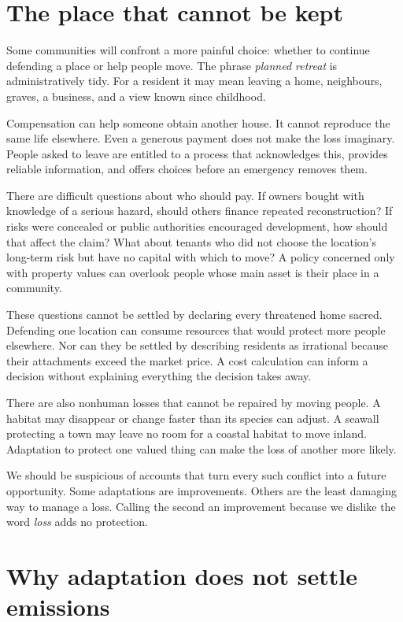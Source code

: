 \documentclass[12pt,a4paper]{book}
\begin{document}
\section*{The place that cannot be kept}

Some communities will confront a more painful choice: whether to continue defending a place or help people move. The phrase \emph{planned retreat} is administratively tidy. For a resident it may mean leaving a home, neighbours, graves, a business, and a view known since childhood.

Compensation can help someone obtain another house. It cannot reproduce the same life elsewhere. Even a generous payment does not make the loss imaginary. People asked to leave are entitled to a process that acknowledges this, provides reliable information, and offers choices before an emergency removes them.

There are difficult questions about who should pay. If owners bought with knowledge of a serious hazard, should others finance repeated reconstruction? If risks were concealed or public authorities encouraged development, how should that affect the claim? What about tenants who did not choose the location's long-term risk but have no capital with which to move? A policy concerned only with property values can overlook people whose main asset is their place in a community.

These questions cannot be settled by declaring every threatened home sacred. Defending one location can consume resources that would protect more people elsewhere. Nor can they be settled by describing residents as irrational because their attachments exceed the market price. A cost calculation can inform a decision without explaining everything the decision takes away.

There are also nonhuman losses that cannot be repaired by moving people. A habitat may disappear or change faster than its species can adjust. A seawall protecting a town may leave no room for a coastal habitat to move inland. Adaptation to protect one valued thing can make the loss of another more likely.

We should be suspicious of accounts that turn every such conflict into a future opportunity. Some adaptations are improvements. Others are the least damaging way to manage a loss. Calling the second an improvement because we dislike the word \emph{loss} adds no protection.

\section*{Why adaptation does not settle emissions}
\end{document}
